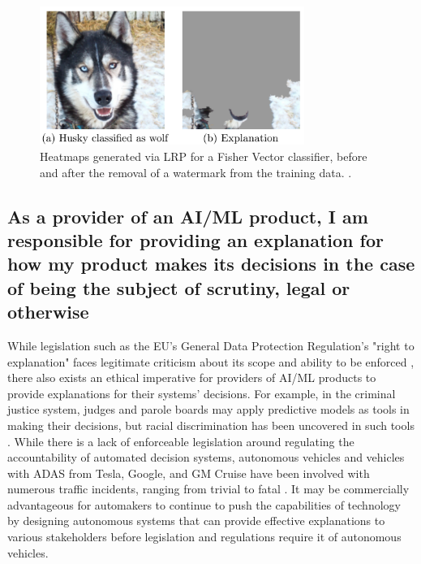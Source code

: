 \begin{figure}
    \centering
    \includegraphics[width=3.4in]{media/ribeiro2016.png}
    \caption{Heatmaps generated via LRP for a Fisher Vector classifier, before and after the removal of a watermark from the training data. \cite{Ribeiro:2016:WIT:2939672.2939778}.}
    \label{fig:ribeiro2016}
\end{figure}

\subsection{As a provider of an AI/ML product, I am responsible for providing an explanation for how my product makes its decisions in the case of being the subject of scrutiny, legal or otherwise}\label{subsec:UseCase3}

While legislation such as the EU's General Data Protection Regulation's "right to explanation" faces legitimate criticism about its scope and ability to be enforced \cite{Mittelstadt2017}, there also exists an ethical imperative for providers of AI/ML products to provide explanations for their systems' decisions.  For example, in the criminal justice system, judges and parole boards may apply predictive models as tools in making their decisions, but racial discrimination has been uncovered in such tools \cite{Wexler.2017} \cite{Angwin2016}.  While there is a lack of enforceable legislation around regulating the accountability of automated decision systems, autonomous vehicles and vehicles with ADAS from Tesla, Google, and GM Cruise have been involved with numerous traffic incidents, ranging from trivial to fatal \cite{Read2016} \cite{Tesla2018} \cite{Ackerman2016} \cite{Bhavsar2017}.  It may be commercially advantageous for automakers to continue to push the capabilities of technology by designing autonomous systems that can provide effective explanations to various stakeholders before legislation and regulations require it of autonomous vehicles.
